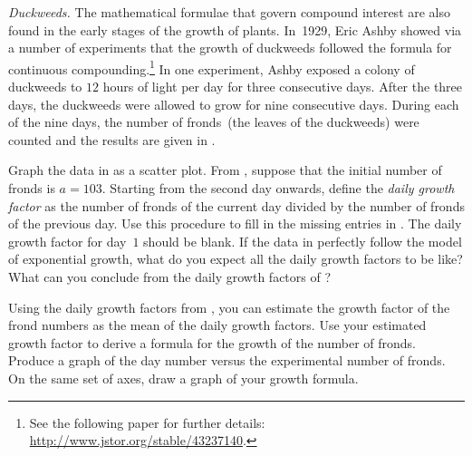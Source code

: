 \documentclass[a4paper,oneside,12pt]{article}
\begin{document}
\begin{problem}
\item\label{prob:duckweeds}
  \emph{Duckweeds.}
  The mathematical formulae that govern compound interest are also
  found in the early stages of the growth of plants.  In~1929, Eric
  Ashby showed via a number of experiments that the growth of
  duckweeds followed the formula for continuous compounding.\footnote{
    See the following paper for further details:
    \url{http://www.jstor.org/stable/43237140}.
  }
  In one experiment, Ashby exposed a colony of duckweeds to $12$ hours
  of light per day for three consecutive days.  After the three days,
  the duckweeds were allowed to grow for nine consecutive days.
  During each of the nine days, the number of fronds~(the leaves of
  the duckweeds) were counted and the results are given in
  .
  \begin{packedenum}
  \item\label{subprob:duckweeds_growth_factor}
    Graph the data in  as a
    scatter plot.  From , suppose
    that the initial number of fronds is $a = 103$.  Starting from the
    second day onwards, define the \emph{daily growth factor} as the
    number of fronds of the current day divided by the number of
    fronds of the previous day.  Use this procedure to fill in the
    missing entries in .  The
    daily growth factor for day~$1$ should be blank.  If the data in
     perfectly follow the model of
    exponential growth, what do you expect all the daily growth
    factors to be like?  What can you conclude from the daily growth
    factors of ?

  \item\label{subprob:duckweeds_growth_factor_estimate}
    Using the daily growth factors
    from , you can estimate the
    growth factor of the frond numbers as the mean of the daily growth
    factors.  Use your estimated growth factor to derive a formula for
    the growth of the number of fronds.  Produce a graph of the day
    number versus the experimental number of fronds.  On the same set
    of axes, draw a graph of your growth formula.


\end{packedenum}
\end{problem}
\end{document}
